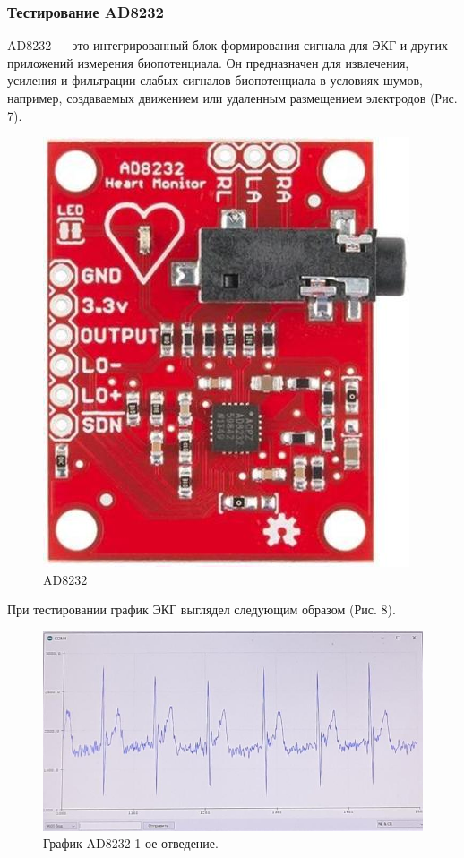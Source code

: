 \documentclass[12pt, russian]{extarticle}
\begin{document}
\begin{spacing}{1.5}
\subsubsection{Тестирование AD8232}

AD8232 — это интегрированный блок формирования сигнала для ЭКГ и других приложений измерения биопотенциала. Он предназначен для извлечения, усиления и фильтрации слабых сигналов биопотенциала в условиях шумов, например, создаваемых движением или удаленным размещением электродов (Рис. 7).

\begin{figure}[htbp]
\centering
\includegraphics[scale=1.4, angle=90]{resources/ad8232/ad8232.png}
\caption{AD8232}
\label{fig:my_label}
\end{figure}

При тестировании график ЭКГ выглядел следующим образом (Рис. 8).

\begin{figure}[htbp]
\centering
\includegraphics[scale=0.5]{resources/ad8232/1е-отведение.jpg}
\caption{График AD8232 1-ое отведение.}
\label{fig:my_label}
\end{figure}


\end{spacing}
\end{document}
